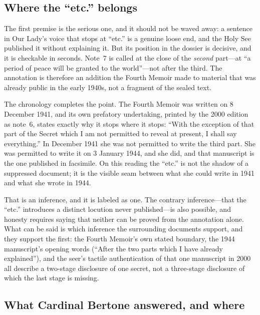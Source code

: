 \subsection{Where the ``etc.'' belongs}

The first premise is the serious one, and it should not be waved
away: a sentence in Our Lady's voice that stops at ``etc.'' is a
genuine loose end, and the Holy See published it without explaining
it. But its position in the dossier is decisive, and it is checkable
in seconds. Note~7 is called at the close of the \emph{second}
part---at ``a period of peace will be granted to the world''---not
after the third. The annotation is therefore an addition the Fourth
Memoir made to material that was already public in the early 1940s,
not a fragment of the sealed text.

The chronology completes the point. The Fourth Memoir was written on
8 December 1941, and its own prefatory undertaking, printed by the
2000 edition as note~6, states exactly why it stops where it stops:
``With the exception of that part of the Secret which I am not
permitted to reveal at present, I shall say everything.'' In December
1941 she was not permitted to write the third part. She was permitted
to write it on 3 January 1944, and she did, and that manuscript is
the one published in facsimile. On this reading the ``etc.'' is not
the shadow of a suppressed document; it is the visible seam between
what she could write in 1941 and what she wrote in 1944.

That is an inference, and it is labeled as one. The contrary
inference---that the ``etc.'' introduces a distinct locution never
published---is also possible, and honesty requires saying that
neither can be proved from the annotation alone. What can be said is
which inference the surrounding documents support, and they support
the first: the Fourth Memoir's own stated boundary, the 1944
manuscript's opening words (``After the two parts which I have
already explained''), and the seer's tactile authentication of that
one manuscript in 2000 all describe a two-stage disclosure of one
secret, not a three-stage disclosure of which the last stage is
missing.

\subsection{What Cardinal Bertone answered, and where}

